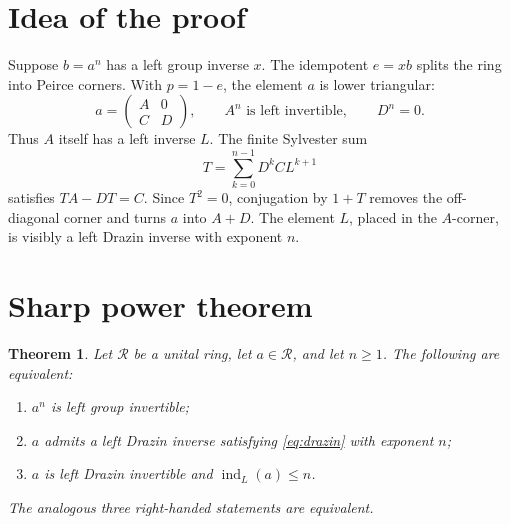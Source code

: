 \documentclass[11pt]{article}
\newtheorem{theorem}{Theorem}
\newcommand{\R}{\mathcal R}
\newcommand{\indL}{\operatorname{ind}_{L}}
\begin{document}
\section*{Idea of the proof}

Suppose \(b=a^n\) has a left group inverse \(x\).  The idempotent
\(e=xb\) splits the ring into Peirce corners.  With \(p=1-e\), the element
\(a\) is lower triangular:
\[
 a=\begin{pmatrix}A&0\\ C&D\end{pmatrix},
 \qquad A^n\text{ is left invertible},\qquad D^n=0.
\]
Thus \(A\) itself has a left inverse \(L\).  The finite Sylvester sum
\[
 T=\sum_{k=0}^{n-1}D^kCL^{k+1}
\]
satisfies \(TA-DT=C\).  Since \(T^2=0\), conjugation by \(1+T\) removes the
off-diagonal corner and turns \(a\) into \(A+D\).  The element \(L\), placed
in the \(A\)-corner, is visibly a left Drazin inverse with exponent \(n\).

\section*{Sharp power theorem}

\begin{theorem}\label{thm:main}
Let \(\R\) be a unital ring, let \(a\in\R\), and let \(n\geq1\).  The
following are equivalent:
\begin{enumerate}
\item \(a^n\) is left group invertible;
\item \(a\) admits a left Drazin inverse satisfying
      \eqref{eq:drazin} with exponent \(n\);
\item \(a\) is left Drazin invertible and \(\indL(a)\leq n\).
\end{enumerate}
The analogous three right-handed statements are equivalent.
\end{theorem}
\end{document}
